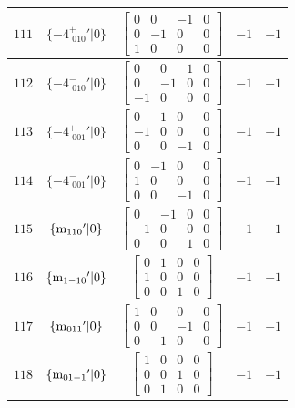 \documentclass[fleqn,8pt]{jsarticle}
\begin{document}
\begin{longtable}{ccccc}
$ 111 $ & $ \{-4^{+}_{\,\,010}{}'|0\} $ & $ \begin{bmatrix} 0 & 0 & -1 & 0 \\ 0 & -1 & 0 & 0 \\ 1 & 0 & 0 & 0 \end{bmatrix} $ & $ -1 $ & $ -1 $ \\ \hline
$ 112 $ & $ \{-4^{-}_{\,\,010}{}'|0\} $ & $ \begin{bmatrix} 0 & 0 & 1 & 0 \\ 0 & -1 & 0 & 0 \\ -1 & 0 & 0 & 0 \end{bmatrix} $ & $ -1 $ & $ -1 $ \\ \hline
$ 113 $ & $ \{-4^{+}_{\,\,001}{}'|0\} $ & $ \begin{bmatrix} 0 & 1 & 0 & 0 \\ -1 & 0 & 0 & 0 \\ 0 & 0 & -1 & 0 \end{bmatrix} $ & $ -1 $ & $ -1 $ \\ \hline
$ 114 $ & $ \{-4^{-}_{\,\,001}{}'|0\} $ & $ \begin{bmatrix} 0 & -1 & 0 & 0 \\ 1 & 0 & 0 & 0 \\ 0 & 0 & -1 & 0 \end{bmatrix} $ & $ -1 $ & $ -1 $ \\ \hline
$ 115 $ & $ \{{\rm m}_{110}{}'|0\} $ & $ \begin{bmatrix} 0 & -1 & 0 & 0 \\ -1 & 0 & 0 & 0 \\ 0 & 0 & 1 & 0 \end{bmatrix} $ & $ -1 $ & $ -1 $ \\ \hline
$ 116 $ & $ \{{\rm m}_{1-10}{}'|0\} $ & $ \begin{bmatrix} 0 & 1 & 0 & 0 \\ 1 & 0 & 0 & 0 \\ 0 & 0 & 1 & 0 \end{bmatrix} $ & $ -1 $ & $ -1 $ \\ \hline
$ 117 $ & $ \{{\rm m}_{011}{}'|0\} $ & $ \begin{bmatrix} 1 & 0 & 0 & 0 \\ 0 & 0 & -1 & 0 \\ 0 & -1 & 0 & 0 \end{bmatrix} $ & $ -1 $ & $ -1 $ \\ \hline
$ 118 $ & $ \{{\rm m}_{01-1}{}'|0\} $ & $ \begin{bmatrix} 1 & 0 & 0 & 0 \\ 0 & 0 & 1 & 0 \\ 0 & 1 & 0 & 0 \end{bmatrix} $ & $ -1 $ & $ -1 $ \\ \hline

\end{longtable}
\end{document}
